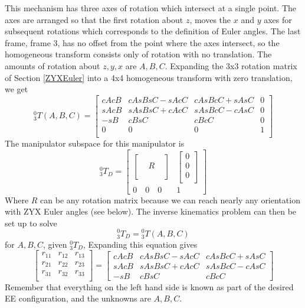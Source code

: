 \begin{Example}
This mechanism has three axes of rotation which intersect at a single point.  The axes are arranged so that the first rotation about $z$, moves the $x$ and $y$ axes for subsequent rotations which corresponds to the definition of Euler angles.  The last frame, frame 3, has no offset from the point where the axes intersect, so the homogeneous transform consists only of rotation with no translation. The amounts of rotation about $z,y,x$ are $A,B,C$.   Expanding the 3x3 rotation matrix of Section \ref{ZYXEuler} into a 4x4 homogeneous transform with zero translation, we get
\[
{^0_3T}(A,B,C)  =
\begin{bmatrix}
cAcB  &  cAsBsC-sAcC    &  cAsBcC+sAsC  & 0  \\
sAcB  &  sAsBsC+cAcC    &  sAsBcC-cAsC  & 0  \\
-sB   &  cBsC           &    cBcC       & 0  \\
0     &     0           &      0        & 1  \\
\end{bmatrix}
\]
The manipulator subspace for this manipulator is
\[
^0_3T_D =
\begin{bmatrix}
\begin{bmatrix}  &  &  \\  &  R &   \\ & & \\ \end{bmatrix}      &
 \begin{bmatrix} 0 \\ 0 \\  0  \\ \end{bmatrix}            \\
 0 \quad 0 \quad 0      &   1
\end{bmatrix}
\]
Where $R$ can be any rotation matrix because we can reach nearly any orientation with ZYX Euler angles (see below).   The inverse kinematics problem can then be set up to solve
\[
^0_3T_D = {^0_3T}(A,B,C)
\]
for $A,B,C$, given $^0_3T_D$,     Expanding this equation gives
\[
\begin{bmatrix}
r_{11}    & r_{12}  & r_{13} \\
r_{21}    & r_{22}  & r_{23} \\
r_{31}    & r_{32}  & r_{33} \\
\end{bmatrix}
=\begin{bmatrix}
cAcB  &  cAsBsC-sAcC    &  cAsBcC+sAsC   \\
sAcB  &  sAsBsC+cAcC    &  sAsBcC-cAsC   \\
-sB   &  cBsC           &    cBcC
\end{bmatrix}
\]
Remember that everything on the left hand side is known as part of the desired EE configuration, and the unknowns are $A,B,C$.
\end{Example}

